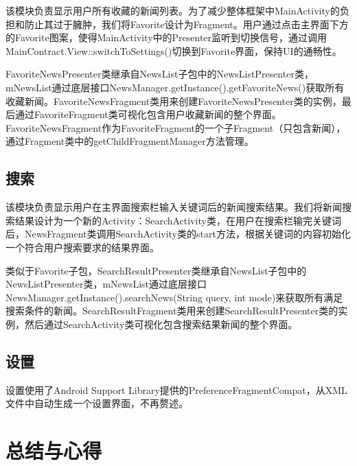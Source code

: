 \documentclass[UTF8]{ctexart}
\begin{document}
	该模块负责显示用户所有收藏的新闻列表。为了减少整体框架中MainActivity的负担和防止其过于臃肿，我们将Favorite设计为Fragment。用户通过点击主界面下方的Favorite图案，使得MainActivity中的Presenter监听到切换信号，通过调用MainContract.View::switchToSettings()切换到Favorite界面，保持UI的通畅性。

	FavoriteNewsPresenter类继承自NewsList子包中的NewsListPresenter类，mNewsList通过底层接口NewsManager.getInstance().getFavoriteNews()获取所有收藏新闻。FavoriteNewsFragment类用来创建FavoriteNewsPresenter类的实例，最后通过FavoriteFragment类可视化包含用户收藏新闻的整个界面。FavoriteNewsFragment作为FavoriteFragment的一个子Fragment（只包含新闻），通过Fragment类中的getChildFragmentManager方法管理。

\subsection{搜索}

	该模块负责显示用户在主界面搜索栏输入关键词后的新闻搜索结果。我们将新闻搜索结果设计为一个新的Activity：SearchActivity类，在用户在搜索栏输完关键词后，NewsFragment类调用SearchActivity类的start方法，根据关键词的内容初始化一个符合用户搜索要求的结果界面。

	类似于Favorite子包，SearchResultPresenter类继承自NewsList子包中的NewsListPresenter类，mNewsList通过底层接口NewsManager.getInstance().searchNews(String query, int mode)来获取所有满足搜索条件的新闻。SearchResultFragment类用来创建SearchResultPresenter类的实例，然后通过SearchActivity类可视化包含搜索结果新闻的整个界面。

\subsection{设置}

	设置使用了Android Support Library提供的PreferenceFragmentCompat，从XML文件中自动生成一个设置界面，不再赘述。

\newpage
\section{总结与心得}
\end{document}
